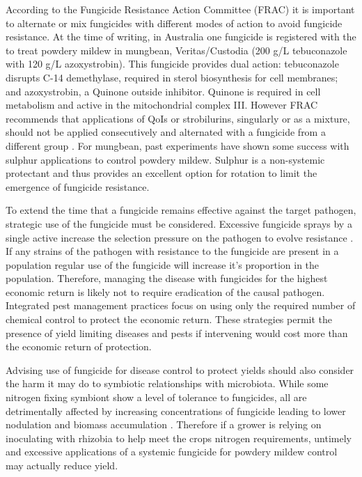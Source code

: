\documentclass[agronomy,article,submit,moreauthors,pdftex]{mdpi}
\begin{document}
According to the Fungicide Resistance Action Committee (FRAC) it is important to alternate or mix fungicides with different modes of action to avoid fungicide resistance.
At the time of writing, in Australia one fungicide is registered with the to treat powdery mildew in mungbean, Veritas/Custodia (200 g/L tebuconazole with 120 g/L azoxystrobin).
This fungicide provides dual action: tebuconazole disrupts C-14 demethylase, required in sterol biosynthesis for cell membranes; and azoxystrobin, a Quinone outside inhibitor.
Quinone is required in cell metabolism and active in the mitochondrial complex III.
However FRAC recommends that applications of QoIs or strobilurins, singularly or as a mixture, should not be applied consecutively and alternated with a fungicide from a different group \citep{Brent2007}.
For mungbean, past experiments have shown some success with sulphur applications to control powdery mildew.
Sulphur is a non-systemic protectant and thus provides an excellent option for rotation to limit the emergence of fungicide resistance.

To extend the time that a fungicide remains effective against the target pathogen, strategic use of the fungicide must be considered.
Excessive fungicide sprays by a single active increase the selection pressure on the pathogen to evolve resistance \citep{Brent2007}.
If any strains of the pathogen with resistance to the fungicide are present in a population regular use of the fungicide will increase it's proportion in the population.
Therefore, managing the disease with fungicides for the highest economic return is likely not to require eradication of the causal pathogen.
Integrated pest management practices focus on using only the required number of chemical control to protect the economic return.
These strategies permit the presence of yield limiting diseases and pests if intervening would cost more than the economic return of protection.

Advising use of fungicide for disease control to protect yields should also consider the harm it may do to symbiotic relationships with microbiota.
While some nitrogen fixing symbiont show a level of tolerance to fungicides, all are detrimentally affected by increasing concentrations of fungicide leading to lower nodulation and biomass accumulation \citep[\citet{Shahid2019}]{Ahemad2011}.
Therefore if a grower is relying on inoculating with rhizobia to help meet the crops nitrogen requirements, untimely and excessive applications of a systemic fungicide for powdery mildew control may actually reduce yield.
\end{document}
